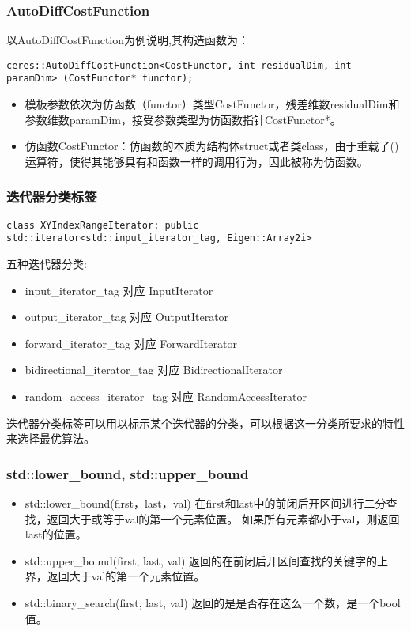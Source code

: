 \begin{frame}[fragile]
  
  \frametitle{AutoDiffCostFunction}

  以AutoDiffCostFunction为例说明,其构造函数为：

  \begin{lstlisting}[frame=shadowbox]
    ceres::AutoDiffCostFunction<CostFunctor, int residualDim, int paramDim> (CostFunctor* functor);
  \end{lstlisting}

  \begin{itemize}
    \item 模板参数依次为仿函数（functor）类型CostFunctor，残差维数residualDim和参数维数paramDim，接受参数类型为仿函数指针CostFunctor*。
    \item 仿函数CostFunctor：仿函数的本质为结构体struct或者类class，由于重载了()运算符，使得其能够具有和函数一样的调用行为，因此被称为仿函数。
  \end{itemize}
  

\end{frame}

\begin{frame}[fragile]
  \frametitle{迭代器分类标签}
  \begin{lstlisting}[title= carto/mapping/2d/xy\_index.h, frame=shadowbox]
    class XYIndexRangeIterator: public std::iterator<std::input_iterator_tag, Eigen::Array2i>
  \end{lstlisting}
  五种迭代器分类:

  \begin{itemize}
    \item input\_iterator\_tag 对应 InputIterator
    \item output\_iterator\_tag 对应 OutputIterator
    \item forward\_iterator\_tag 对应 ForwardIterator
    \item bidirectional\_iterator\_tag 对应 BidirectionalIterator
    \item random\_access\_iterator\_tag 对应 RandomAccessIterator
  \end{itemize}

  迭代器分类标签可以用以标示某个迭代器的分类，可以根据这一分类所要求的特性来选择最优算法。
\end{frame}

\begin{frame}
  \frametitle{std::lower\_bound, std::upper\_bound}
  \begin{itemize}
    \item std::lower\_bound(first，last，val) 在first和last中的前闭后开区间进行二分查找，返回大于或等于val的第一个元素位置。
      如果所有元素都小于val，则返回last的位置。
    \item std::upper\_bound(first, last, val) 返回的在前闭后开区间查找的关键字的上界，返回大于val的第一个元素位置。
    \item std::binary\_search(first, last, val) 返回的是是否存在这么一个数，是一个bool值。
  \end{itemize}
\end{frame}

